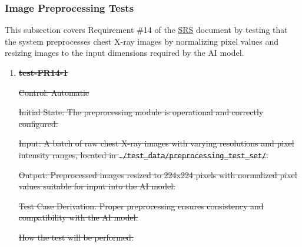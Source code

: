 \documentclass[12pt, titlepage]{article}
\begin{document}
\subsubsection{Image Preprocessing Tests}

This subsection covers Requirement \#14 of the \href{https://github.com/RezaJodeiri/CXR-Capstone/blob/main/docs/SRS/SRS.pdf}{SRS} \citep{SRS}
document by testing that the system preprocesses chest X-ray images by normalizing pixel values and resizing images to the input dimensions required by the AI model.

\begin{enumerate}

\item \textbf{\sout{test-FR14-1}} \label{test-FR14-1}

\sout{Control: Automatic}

\sout{Initial State: The preprocessing module is operational and correctly configured.}

\sout{Input: A batch of raw chest X-ray images with varying resolutions and pixel intensity ranges, located in \texttt{./test\_data/preprocessing\_test\_set/}.}

\sout{Output: Preprocessed images resized to 224x224 pixels with normalized pixel values suitable for input into the AI model.}

\sout{Test Case Derivation: Proper preprocessing ensures consistency and compatibility with the AI model.}

\sout{How the test will be performed:}


\end{enumerate}
\end{document}
